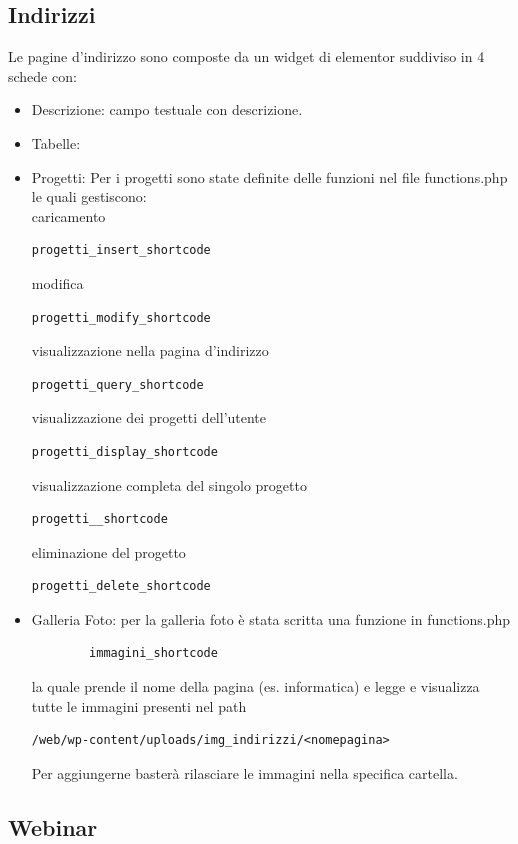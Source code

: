 \documentclass{article}
\begin{document}
	\subsection{\textbf{Indirizzi}}
	Le pagine d'indirizzo sono composte da un widget di elementor suddiviso in 4 schede con:
	\begin{itemize}
		\item Descrizione: campo testuale con descrizione.
		\item Tabelle: 
		\item Progetti: Per i progetti sono state definite delle funzioni nel file functions.php le quali gestiscono:\\ caricamento \begin{verbatim}progetti_insert_shortcode\end{verbatim} modifica \begin{verbatim}progetti_modify_shortcode\end{verbatim} visualizzazione nella pagina d'indirizzo \begin{verbatim}progetti_query_shortcode\end{verbatim} visualizzazione dei progetti dell'utente \begin{verbatim}progetti_display_shortcode\end{verbatim} visualizzazione completa del singolo progetto \begin{verbatim}progetti__shortcode\end{verbatim} eliminazione del progetto \begin{verbatim}progetti_delete_shortcode\end{verbatim}
		\item Galleria Foto: per la galleria foto è stata scritta una funzione in functions.php \begin{verbatim}
		immagini_shortcode
		\end{verbatim} la quale prende il nome della pagina (es. informatica) e legge e visualizza tutte le immagini  presenti nel path \begin{verbatim}/web/wp-content/uploads/img_indirizzi/<nomepagina>\end{verbatim} Per aggiungerne basterà rilasciare le immagini nella specifica cartella.
	\end{itemize}


	\subsection{\textbf{Webinar}}
	
\end{document}

